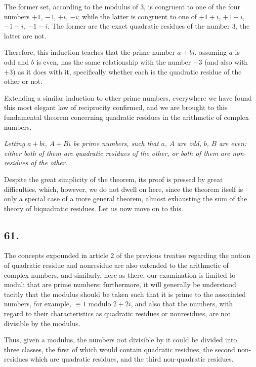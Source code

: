 \documentclass[twoside,12pt, showframe]{memoir}
\begin{document}
The former set, according to the modulus of \(3\), is congruent to one of the four numbers \(+1\), \(-1\), \(+i\), \(-i\); while the latter is congruent to one of \(+1+i\), \(+1-i\), \(-1+i\), \(-1-i\). The former are the exact quadratic residues of the number \(3\), the latter are not.

Therefore, this induction teaches that the prime number \(a+b i\), assuming \(a\) is odd and \(b\) is even, has the same relationship with the number \(-3\) (and also with \(+3\)) as it does with it, specifically whether each is the quadratic residue of the other or not.
%

Extending a similar induction to other prime numbers, everywhere we have found this most elegant law of reciprocity confirmed, and we are brought to this fundamental theorem concerning quadratic residues in the arithmetic of complex numbers. 
 
\textit{Letting \(a+b i\), \( A+B i\) be prime numbers, such that \(a\), \(A\) are odd, \(b\), \( B\) are even: either both of them are quadratic residues of the other, or both of them are non-residues of the other.} 
 
Despite the great simplicity of the theorem, its proof is pressed by great difficulties, which, however, we do not dwell on here, since the theorem itself is only a special case of a more general theorem, almost exhausting the sum of the theory of biquadratic residues. Let us now move on to this.
%

\subsection*{61.}

The concepts expounded in article 2 of the previous treatise regarding the notion of quadratic residue and nonresidue are also extended to the arithmetic of complex numbers, and similarly, here as there, our examination is limited to moduli that are prime numbers; furthermore, it will generally be understood tacitly that the modulus should be taken such that it is prime to the associated numbers, for example, \(\equiv 1\) modulo \(2+2i\), and also that the numbers, with regard to their characteristics as quadratic residues or nonresidues, are not divisible by the modulus.

Thus, given a modulus, the numbers not divisible by it could be divided into three classes, the first of which would contain quadratic residues, the second non-residues which are quadratic residues, and the third non-quadratic residues.
%
\end{document}
